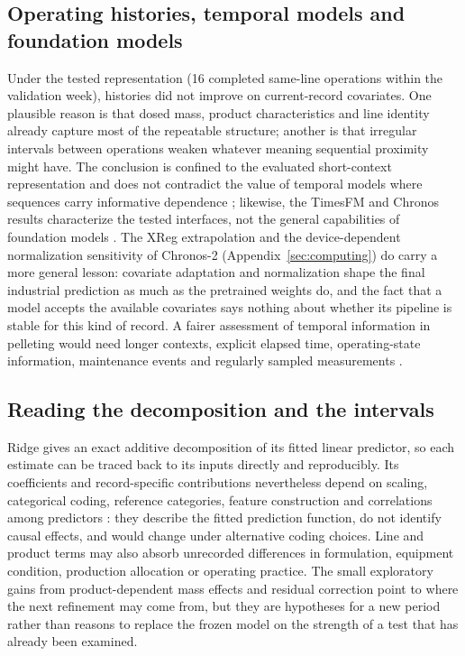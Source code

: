 \subsection{Operating histories, temporal models and foundation models}
Under the tested representation (16 completed same-line operations within the validation week), histories did not improve on current-record covariates. One plausible reason is that dosed mass, product characteristics and line identity already capture most of the repeatable structure; another is that irregular intervals between operations weaken whatever meaning sequential proximity might have. The conclusion is confined to the evaluated short-context representation and does not contradict the value of temporal models where sequences carry informative dependence \citep{lim2021,challu2023}; likewise, the TimesFM and Chronos results characterize the tested interfaces, not the general capabilities of foundation models \citep{das2024,ansari2024,ansari2025}. The XReg extrapolation and the device-dependent normalization sensitivity of Chronos-2 (Appendix~\ref{sec:computing}) do carry a more general lesson: covariate adaptation and normalization shape the final industrial prediction as much as the pretrained weights do, and the fact that a model accepts the available covariates says nothing about whether its pipeline is stable for this kind of record. A fairer assessment of temporal information in pelleting would need longer contexts, explicit elapsed time, operating-state information, maintenance events and regularly sampled measurements \citep{aksu2024,zeng2023}.

\subsection{Reading the decomposition and the intervals}
Ridge gives an exact additive decomposition of its fitted linear predictor, so each estimate can be traced back to its inputs directly and reproducibly. Its coefficients and record-specific contributions nevertheless depend on scaling, categorical coding, reference categories, feature construction and correlations among predictors \citep{rudin2019,aas2021,fisher2019}: they describe the fitted prediction function, do not identify causal effects, and would change under alternative coding choices. Line and product terms may also absorb unrecorded differences in formulation, equipment condition, production allocation or operating practice. The small exploratory gains from product-dependent mass effects and residual correction point to where the next refinement may come from, but they are hypotheses for a new period rather than reasons to replace the frozen model on the strength of a test that has already been examined.


